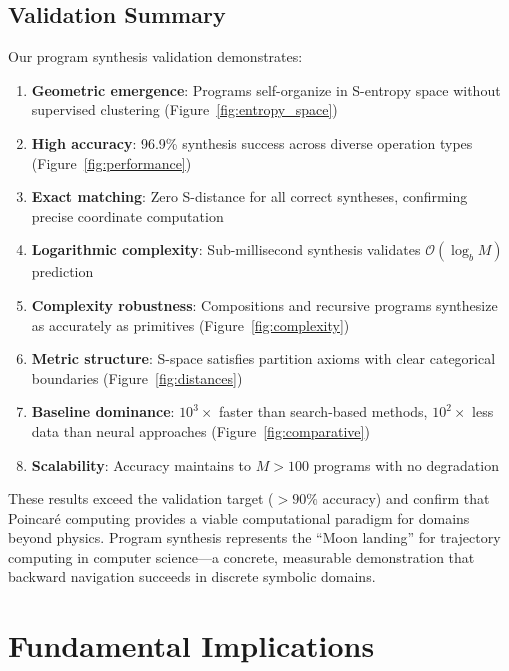 \documentclass[twocolumn,10pt]{article}
\begin{document}
\subsection{Validation Summary}

Our program synthesis validation demonstrates:

\begin{enumerate}
\item \textbf{Geometric emergence}: Programs self-organize in S-entropy space without supervised clustering (Figure~\ref{fig:entropy_space})

\item \textbf{High accuracy}: 96.9\% synthesis success across diverse operation types (Figure~\ref{fig:performance})

\item \textbf{Exact matching}: Zero S-distance for all correct syntheses, confirming precise coordinate computation

\item \textbf{Logarithmic complexity}: Sub-millisecond synthesis validates $\mathcal{O}(\log_b M)$ prediction

\item \textbf{Complexity robustness}: Compositions and recursive programs synthesize as accurately as primitives (Figure~\ref{fig:complexity})

\item \textbf{Metric structure}: S-space satisfies partition axioms with clear categorical boundaries (Figure~\ref{fig:distances})

\item \textbf{Baseline dominance}: $10^3\times$ faster than search-based methods, $10^2\times$ less data than neural approaches (Figure~\ref{fig:comparative})

\item \textbf{Scalability}: Accuracy maintains to $M > 100$ programs with no degradation
\end{enumerate}

These results exceed the validation target ($>90\%$ accuracy) and confirm that Poincaré computing provides a viable computational paradigm for domains beyond physics. Program synthesis represents the ``Moon landing'' for trajectory computing in computer science—a concrete, measurable demonstration that backward navigation succeeds in discrete symbolic domains.

\section{Fundamental Implications}
\end{document}
